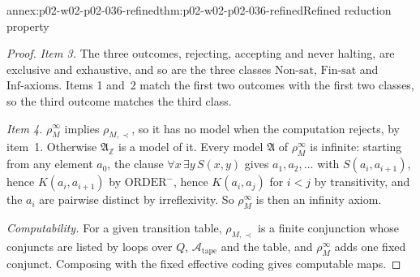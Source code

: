\begin{annexitem}{annex:p02-w02-p02-036-refined}{thm:p02-w02-p02-036-refined}{Refined reduction property}
\begin{proof}
\emph{Item 3.}  The three outcomes, rejecting, accepting and never halting,
are exclusive and exhaustive, and so are the three classes
\(\mathrm{Non\text{-}sat}\), \(\mathrm{Fin\text{-}sat}\) and
\(\mathrm{Inf\text{-}axioms}\).  Items 1 and~2 match the first two outcomes
with the first two classes, so the third outcome matches the third class.

\emph{Item 4.}  \(\rho^{\infty}_M\) implies \(\rho_{M,\prec}\), so it has no model
when the computation rejects, by item~1.  Otherwise
\(\mathfrak A_{\mathbb Z}\) is a model of it.  Every model \(\mathfrak A\) of
\(\rho^{\infty}_M\) is infinite: starting from any element \(a_0\), the clause
\(\forall x\,\exists y\,S(x,y)\) gives \(a_1,a_2,\ldots\) with
\(S(a_i,a_{i+1})\), hence \(K(a_i,a_{i+1})\) by \(\mathrm{ORDER}^{-}\), hence
\(K(a_i,a_j)\) for \(i<j\) by transitivity, and the \(a_i\) are pairwise
distinct by irreflexivity.  So \(\rho^{\infty}_M\) is then an infinity axiom.

\emph{Computability.}  For a given transition table, \(\rho_{M,\prec}\) is a
finite conjunction whose conjuncts are listed by loops over \(Q\),
\(\mathcal A_{\mathrm{tape}}\) and the table, and \(\rho^{\infty}_M\) adds one
fixed conjunct.  Composing with the fixed effective coding gives computable
maps.
\end{proof}
\end{annexitem}

